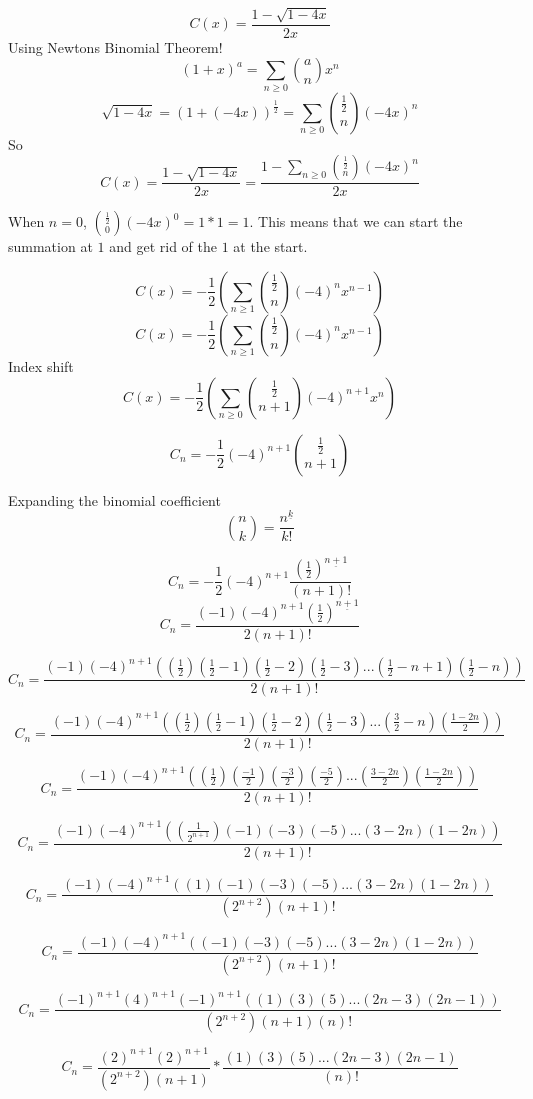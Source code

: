 \documentclass[10pt, AMS Euler]{article}
\begin{document}
    $$ C(x) = \frac{1 - \sqrt{1 - 4x}}{2x} $$
    Using Newtons Binomial Theorem! 
    $$ (1+x)^a = \sum_{n \geq 0 } \binom{a}{n} x^n $$
    $$ \sqrt{1 - 4x} = (1+(-4x))^{\frac{1}{2}} = \sum_{n \geq 0 } \binom{\frac{1}{2}}{n} (-4x)^n $$
    So
    $$ C(x) = \frac{1 - \sqrt{1 - 4x}}{2x} = \frac{1 - \sum_{n \geq 0 } \binom{\frac{1}{2}}{n} (-4x)^n }{2x} $$

    When $n=0$, $\binom{\frac{1}{2}}{0} (-4x)^0 = 1 * 1 = 1 $. This means that we can start the summation at $1$ and get rid of the $1$ at the start.
    
    $$ C(x) = -\frac{1}{2}(\sum_{n \geq 1 } \binom{\frac{1}{2}}{n} (-4)^n x^{n-1}) $$
    $$ C(x) = -\frac{1}{2}(\sum_{n \geq 1 } \binom{\frac{1}{2}}{n} (-4)^n x^{n-1}) $$
    Index shift
    $$ C(x) = -\frac{1}{2}(\sum_{n \geq 0 } \binom{\frac{1}{2}}{n+1} (-4)^{n+1} x^n) $$
    
    $$ C_n = -\frac{1}{2} (-4)^{n+1} \binom{\frac{1}{2}}{n+1} $$

    Expanding the binomial coefficient
    $$ \binom{n}{k} = \frac{n^{\underline{k}}}{k!} $$

    $$ C_n = -\frac{1}{2} (-4)^{n+1} \frac{(\frac{1}{2})^{\underline{n+1}}}{(n+1)!} $$
    $$ C_n = \frac{(-1)(-4)^{n+1} (\frac{1}{2})^{\underline{n+1}}}{2(n+1)!} $$

    $$ C_n = \frac{(-1)(-4)^{n+1} ((\frac{1}{2})(\frac{1}{2} -1)(\frac{1}{2} -2)(\frac{1}{2} -3)...(\frac{1}{2} - n + 1)(\frac{1}{2} - n))}{2(n+1)!} $$

    $$ C_n = \frac{(-1)(-4)^{n+1} ((\frac{1}{2})(\frac{1}{2} -1)(\frac{1}{2} -2)(\frac{1}{2} -3)...(\frac{3}{2} - n)(\frac{1-2n}{2}))}{2(n+1)!} $$

    $$ C_n = \frac{(-1)(-4)^{n+1} ((\frac{1}{2})(\frac{-1}{2})(\frac{-3}{2})(\frac{-5}{2})...(\frac{3-2n}{2})(\frac{1-2n}{2}))}{2(n+1)!} $$

    $$ C_n = \frac{(-1)(-4)^{n+1} ((\frac{1}{2^{n+1}})(-1)(-3)(-5)...(3-2n)(1-2n))}{2(n+1)!} $$

    $$ C_n = \frac{(-1)(-4)^{n+1} ((1)
    (-1)(-3)(-5)...(3-2n)(1-2n))}{(2^{n+2})(n+1)!} $$

    $$ C_n = \frac{(-1)(-4)^{n+1} ((-1)(-3)(-5)...(3-2n)(1-2n))}{(2^{n+2})(n+1)!} $$

    $$ C_n = \frac{(-1)^{n+1} (4)^{n+1} (-1)^{n+1} ((1)(3)(5)...(2n-3)(2n-1))}{(2^{n+2})(n+1)(n)!} $$

    $$ C_n = \frac{(2)^{n+1} (2)^{n+1} }{(2^{n+2})(n+1)} * \frac{(1)(3)(5)...(2n-3)(2n-1)}{(n)!} $$
\end{document}
